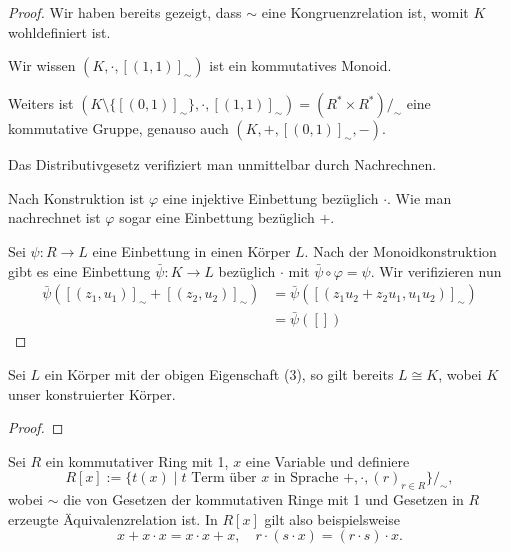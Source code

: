 \begin{proof}
    Wir haben bereits gezeigt, dass $\sim$ eine Kongruenzrelation ist, womit $K$ wohldefiniert ist.

    Wir wissen $(K, \cdot, [(1,1)]_\sim)$ ist ein kommutatives Monoid.

    Weiters ist $(K \setminus \{ [(0,1)]_\sim \}, \cdot, [(1, 1)]_\sim) = (R^* \times R^*)/_\sim$ eine kommutative Gruppe, genauso auch $(K, +, [(0,1)]_\sim, -)$.

    Das Distributivgesetz verifiziert man unmittelbar durch Nachrechnen.

    Nach Konstruktion ist $\varphi$ eine injektive Einbettung bezüglich $\cdot$. Wie man nachrechnet ist $\varphi$ sogar eine Einbettung bezüglich $+$.

    Sei $\psi : R \to L$ eine Einbettung in einen Körper $L$. Nach der Monoidkonstruktion gibt es eine Einbettung $\bar{\psi} : K \to L$ bezüglich $\cdot$ mit $\bar{\psi} \circ \varphi = \psi$. Wir verifizieren nun
    \begin{align*}
        \bar{\psi} ([(z_1, u_1)]_\sim + [(z_2, u_2)]_\sim) &= \bar{\psi} ([(z_1 u_2 + z_2 u_1, u_1 u_2)]_\sim) \\
        &= \bar{\psi}([])
    \end{align*}
\end{proof}

\begin{proposition}
    Sei $L$ ein Körper mit der obigen Eigenschaft (3), so gilt bereits $L \cong K$, wobei $K$ unser konstruierter Körper.
\end{proposition}

\begin{proof}
    
\end{proof}

\begin{example}
    Sei $R$ ein kommutativer Ring mit 1, $x$ eine Variable und definiere
    $$ R[x] := \{ t(x) \mid t \text{ Term über $x$ in Sprache } +, \cdot, (r)_{r \in R} \}/_\sim, $$
    wobei $\sim$ die von Gesetzen der kommutativen Ringe mit 1 und Gesetzen in $R$ erzeugte Äquivalenzrelation ist. In $R[x]$ gilt also beispielsweise
    $$ x + x \cdot x = x \cdot x + x, \quad r \cdot (s \cdot x) = (r \cdot s) \cdot x. $$
\end{example}